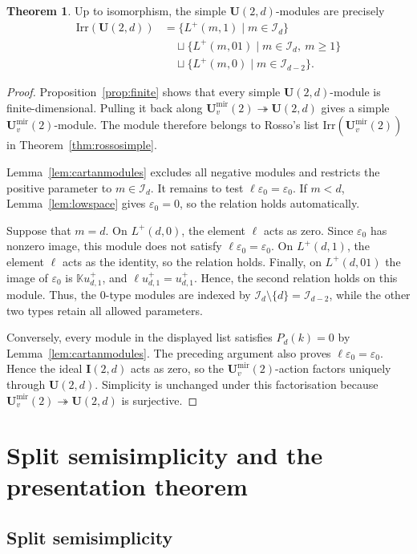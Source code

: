 \documentclass[12pt]{amsart}
\numberwithin{equation}{section}
\theoremstyle{definition}
\newtheorem{theorem}{Theorem}[section]
\theoremstyle{definition}
\newcommand{\kk}{\mathbb K}
\newcommand{\Umir}{\mathbf U^{\mathrm{mir}}_v(2)}
\newcommand{\Ufd}{\mathbf U(2,d)}
\newcommand{\eps}{\varepsilon}
\newcommand{\Iset}{\mathcal I}
\newcommand{\Ifd}{\mathbf{I}(2,d)}
\begin{document}
\begin{theorem}\label{thm:simples}
Up to isomorphism, the simple $\Ufd$-modules are precisely
\begin{align*}
\mathrm{Irr}(\Ufd)&=\{L^+(m,1)\mid m\in\Iset_d\}\\
&\quad \sqcup \{L^+(m,01)\mid m\in\Iset_d,\ m\ge1\}\\
&\quad \sqcup \{L^+(m,0)\mid m\in\Iset_{d-2}\}.
\end{align*}
\end{theorem}
\begin{proof}
Proposition~\ref{prop:finite} shows that every simple $\Ufd$-module is finite-dimensional. Pulling it back along $\Umir\twoheadrightarrow\Ufd$ gives a simple $\Umir$-module. The module therefore belongs to Rosso's list $\mathrm{Irr}(\Umir)$ in Theorem~\ref{thm:rossosimple}.

Lemma~\ref{lem:cartanmodules} excludes all negative modules and restricts the positive parameter to $m\in\Iset_d$. It remains to test $\ell\eps_0=\eps_0$. If $m<d$, Lemma~\ref{lem:lowspace} gives $\eps_0=0$, so the relation holds automatically.

Suppose that $m=d$. On $L^+(d,0)$, the element $\ell$ acts as zero. Since $\eps_0$ has nonzero image, this module does not satisfy $\ell\eps_0=\eps_0$. On $L^+(d,1)$, the element $\ell$ acts as the identity, so the relation holds. Finally, on $L^+(d,01)$ the image of $\eps_0$ is $\kk u^+_{d,1}$, and $\ell u^+_{d,1}=u^+_{d,1}$. 
Hence, the second relation holds on this module. 
Thus, the $0$-type modules are indexed by $\Iset_d\setminus\{d\}=\Iset_{d-2}$, while the other two types retain all allowed parameters.

Conversely, every module in the displayed list satisfies $P_d(k)=0$ by Lemma~\ref{lem:cartanmodules}. The preceding argument also proves $\ell\eps_0=\eps_0$. Hence the ideal $\Ifd$ acts as zero, so the $\Umir$-action factors uniquely through $\Ufd$. Simplicity is unchanged under this factorisation because $\Umir\twoheadrightarrow\Ufd$ is surjective.
\end{proof}


\section{Split semisimplicity and the presentation theorem}\label{sec:main}
\subsection{Split semisimplicity}\label{subsec:split}
\end{document}

